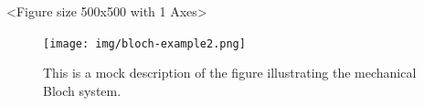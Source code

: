 

  \begin{result}
  <Figure size 500x500 with 1 Axes>
  \end{result}

\begin{figure}[h!]
  \centering
  \texttt{[image: img/bloch-example2.png]}
  \caption{This is a mock description of the figure illustrating the mechanical Bloch system.}
  \label{fig:mechanical_bloch}
\end{figure}

